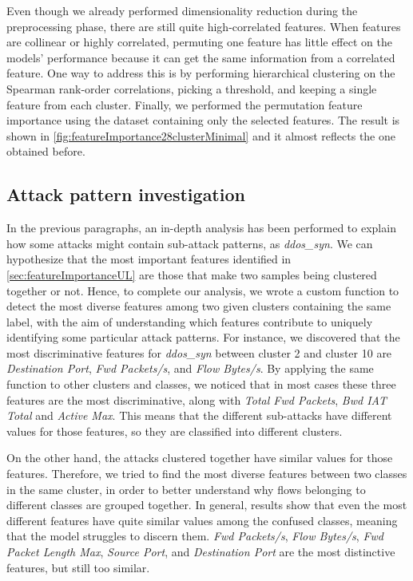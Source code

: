 \documentclass[acmlarge,nonacm]{acmart}
\begin{document}
Even though we already performed dimensionality reduction during the preprocessing phase, there are still quite high-correlated features. When features are collinear or highly correlated, permuting one feature has little effect on the models' performance because it can get the same information from a correlated feature. One way to address this is by performing hierarchical clustering on the Spearman rank-order correlations, picking a threshold, and keeping a single feature from each cluster. Finally, we performed the permutation feature importance using the dataset containing only the selected features. The result is shown in  \cref{fig:featureImportance28clusterMinimal} and it almost reflects the one obtained before.

\subsection{Attack pattern investigation}
In the previous paragraphs, an in-depth analysis has been performed to explain how some attacks might contain sub-attack patterns, as \emph{ddos\_syn}. We can hypothesize that the most important features identified in \cref{sec:featureImportanceUL} are those that make two samples being clustered together or not. Hence, to complete our analysis, we wrote a custom function to detect the most diverse features among two given clusters containing the same label, with the aim of understanding which features contribute to uniquely identifying some particular attack patterns. For instance, we discovered that the most discriminative features for \emph{ddos\_syn} between cluster 2 and cluster 10 are \emph{Destination Port}, \emph{Fwd Packets/s}, and \emph{Flow Bytes/s}. By applying the same function to other clusters and classes, we noticed that in most cases these three features are the most discriminative, along with \emph{Total Fwd Packets}, \emph{Bwd IAT Total} and \emph{Active Max}. This means that the different sub-attacks have different values for those features, so they are classified into different clusters. 

On the other hand, the attacks clustered together have similar values for those features. Therefore, we tried to find the most diverse features between two classes in the same cluster, in order to better understand why flows belonging to different classes are grouped together. In general, results show that even the most different features have quite similar values among the confused classes, meaning that the model struggles to discern them. \emph{Fwd Packets/s}, \emph{Flow Bytes/s}, \emph{Fwd Packet Length Max}, \emph{Source Port}, and \emph{Destination Port} are the most distinctive features, but still too similar.
\end{document}
